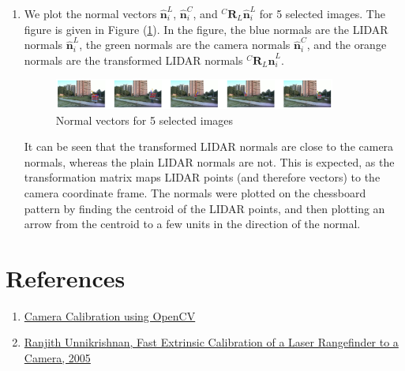 \documentclass[10pt]{article}
\newcommand{\figref}[1]{Figure (\ref{fig:#1})}
\begin{document}
\begin{enumerate}
        \item We plot the normal vectors $\mathbf{\hat{n}}_{i}^{L}$, $\mathbf{\hat{n}}_{i}^{C}$,
        and $^{C} \mathbf{R}_{L} \mathbf{\hat{n}}_{i}^{L}$ for 5 selected images. The
        figure is given in \figref{normals-lidar}. In the figure, the blue normals are
        the LIDAR normals $\mathbf{\hat{n}}_{i}^{L}$, the green normals are the camera
        normals $\mathbf{\hat{n}}_{i}^{C}$, and the orange normals are the transformed
        LIDAR normals $^{C} \mathbf{R}_{L} \mathbf{\hat{n}}_{i}^{L}$.
        \begin{figure}[htbp]
            \begin{center}
                \includegraphics[width=0.875\textwidth]{Assets/Question-5/normals.png}
                \caption{Normal vectors for 5 selected images}
                \label{fig:normals-lidar}
            \end{center}
        \end{figure}
        It can be seen that the transformed LIDAR normals are close to the camera normals,
        whereas the plain LIDAR normals are not. This is expected, as the transformation
        matrix maps LIDAR points (and therefore vectors) to the camera coordinate frame.
        The normals were plotted on the chessboard pattern by finding the centroid of the
        LIDAR points, and then plotting an arrow from the centroid to a few units in the
        direction of the normal.
    \end{enumerate}

    \section*{\textbf{References}}
    \begin{enumerate}
        \item \href{https://learnopencv.com/camera-calibration-using-opencv/}{
            Camera Calibration using OpenCV
        }
        \item \href{https://www.ri.cmu.edu/pub_files/pub4/unnikrishnan_ranjith_2005_3/unnikrishnan_ranjith_2005_3.pdf}{
            Ranjith Unnikrishnan, Fast Extrinsic Calibration of a Laser Rangefinder to a Camera, 2005
        }
    \end{enumerate}
\end{document}
